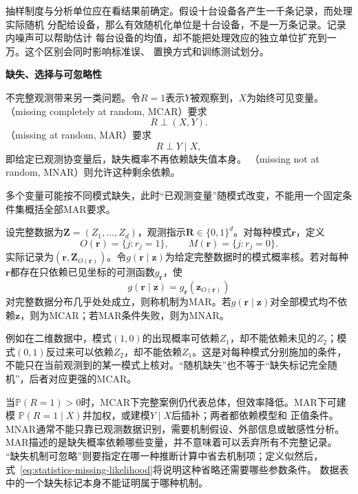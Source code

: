 抽样制度与分析单位应在看结果前确定。假设十台设备各产生一千条记录，而处理实际随机
分配给设备，那么有效随机化单位是十台设备，不是一万条记录。记录内噪声可以帮助估计
每台设备的均值，却不能把处理效应的独立单位扩充到一万。这个区别会同时影响标准误、
置换方式和训练测试划分。

\par\medskip\noindent\textbf{缺失、选择与可忽略性}\quad

不完整观测带来另一类问题。令\(R=1\)表示\(Y\)被观察到，\(X\)为始终可见变量。
（missing completely at random, MCAR）要求
\[
  R\mathrel{\perp}(X,Y).
\]
（missing at random, MAR）要求
\[
  R\mathrel{\perp}Y\mid X,
\]
即给定已观测协变量后，缺失概率不再依赖缺失值本身。
（missing not at random, MNAR）则允许这种剩余依赖。

多个变量可能按不同模式缺失，此时“已观测变量”随模式改变，不能用一个固定条件集概括全部MAR要求。
\begin{definition}[观测模式与缺失机制]
  \label{def:statistics-missingness}
  设完整数据为\(\bm Z=(Z_1,\ldots,Z_d)\)，观测指示\(\bm R\in\{0,1\}^d\)。对每种模式\(\bm r\)，定义
  \[
    O(\bm r)=\{j:r_j=1\},\qquad M(\bm r)=\{j:r_j=0\}.
  \]
  实际记录为\((\bm r,\bm Z_{O(\bm r)})\)。令\(g(\bm r\mid\bm z)\)为给定完整数据时的模式概率核。若对每种\(\bm r\)都存在只依赖已见坐标的可测函数\(g_{\bm r}\)，使
  \[
    g(\bm r\mid\bm z)=g_{\bm r}(\bm z_{O(\bm r)})
  \]
  对完整数据分布几乎处处成立，则称机制为MAR。若\(g(\bm r\mid\bm z)\)对全部模式均不依赖\(\bm z\)，则为MCAR；若MAR条件失败，则为MNAR。
\end{definition}
例如在二维数据中，模式\((1,0)\)的出现概率可依赖\(Z_1\)，却不能依赖未见的\(Z_2\)；模式\((0,1)\)反过来可以依赖\(Z_2\)，却不能依赖\(Z_1\)。这是对每种模式分别施加的条件，不能只在当前观测到的某一模式上核对。“随机缺失”也不等于“缺失标记完全随机”，后者对应更强的MCAR。

当\(\mathbb{P}(R=1)>0\)时，MCAR下完整案例仍代表总体，但效率降低。MAR下可建模
\(\mathbb{P}(R=1\mid X)\)并加权，或建模\(Y\mid X\)后插补；两者都依赖模型和
正值条件。MNAR通常不能只靠已观测数据识别，需要机制假设、外部信息或敏感性分析。
MAR描述的是缺失概率依赖哪些变量，并不意味着可以丢弃所有不完整记录。
“缺失机制可忽略”则要指定在哪一种推断计算中省去机制项；定义似然后，
式~\eqref{eq:statistics-missing-likelihood}将说明这种省略还需要哪些参数条件。
数据表中的一个缺失标记本身不能证明属于哪种机制。

